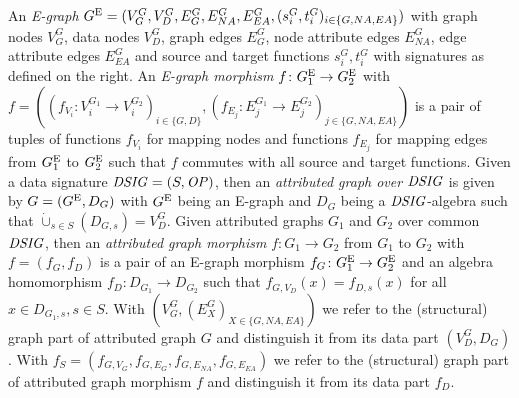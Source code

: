 \vspace{-1.5ex}

\begin{definition}
\label{def:sec-gt-graphs:agraphs}
An \emph{E-graph} $G^\mathrm{E}=(V_G^G,V_D^G,E_G^G,E_{NA}^G,E_{EA}^G,(s_i^G,t_i^G)_{i \in \{G,NA,EA\}})$ with graph nodes $V_G^G$, data nodes $V_D^G$, graph edges $E_G^G$, node attribute edges $E_{NA}^G$, edge attribute edges $E_{EA}^G$ and source and target functions $s_i^G,t_i^G$ with signatures as defined on the right.
An \emph{E-graph morphism} $f\colon G^\mathrm{E}_1 \to G^\mathrm{E}_2$ with $f=((f_{V_i}\colon V_i^{G_1} \to V_i^{G_2})_{i \in \{G,D\}}, (f_{E_j}\colon E_j^{G_1} \to E_j^{G_2})_{j \in \{G,NA,EA\}})$ is a pair of tuples of functions $f_{V_i}$ for mapping nodes and functions $f_{E_j}$ for mapping edges from $G^\mathrm{E}_1$ to $G^\mathrm{E}_2$ such that $f$ commutes with all source and target functions.
Given a data signature $\mathit{DSIG}=(S,\mathit{OP})$, then an \emph{attributed graph over $\mathit{DSIG}$} is given by $G=(G^\mathrm{E},D_G)$ with $G^\mathrm{E}$ being an E-graph and $D_G$ being a $\mathit{DSIG}$-algebra such that $\dot{\cup}_{s \in S}(D_{G,s})=V^G_D$.
Given attributed graphs $G_1$ and $G_2$ over common $\mathit{DSIG}$, then an \emph{attributed graph morphism} $f\colon G_1 \to G_2$ from $G_1$ to $G_2$ with $f=(f_G,f_D)$ is a pair of an E-graph morphism $f_G\colon G^\mathrm{E}_1 \to G^\mathrm{E}_2$ and an algebra homomorphism $f_D\colon D_{G_1} \to D_{G_2}$ such that $f_{G,V_D}(x)=f_{D,s}(x)$ for all $x \in D_{G_1,s},s \in S$.
With $(V^G_G,(E^G_X)_{X \in \{G,NA,EA\}})$ we refer to the (structural) graph part of attributed graph $G$ and distinguish it from its data part $(V^G_D,D_G)$.
With $f_S=(f_{G,V_G},f_{G,E_G},f_{G,E_{NA}},f_{G,E_{EA}})$ we refer to the (structural) graph part of attributed graph morphism $f$ and distinguish it from its data part $f_D$.
\envEndMarker
\end{definition}

